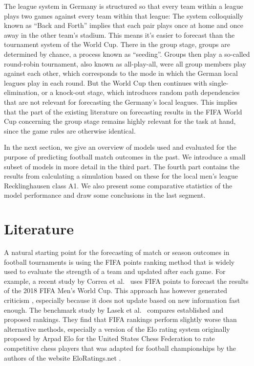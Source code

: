 \documentclass[12pt,a4paper]{article}
\begin{document}
The league system in Germany is structured so that every team within a
league plays two games against every team within that league: The system
colloquially known as \enquote{Back and Forth} implies that each pair
plays once at home and once away in the other team's stadium. This means
it's easier to forecast than the tournament system of the World Cup.
There in the group stage, groups are determined by chance, a process
known as \enquote{seeding}. Groups then play a so-called round-robin
tournament, also known as all-play-all, were all group members play
against each other, which corresponds to the mode in which the German
local leagues play in each round. But the World Cup then continues with
single-elimination, or a knock-out stage, which introduces random path
dependencies that are not relevant for forecasting the Germany's local
leagues. This implies that the part of the existing literature on
forecasting results in the FIFA World Cup concerning the group stage
remains highly relevant for the task at hand, since the game rules are
otherwise identical.

In the next section, we give an overview of models used and evaluated
for the purpose of predicting football match outcomes in the past. We
introduce a small subset of models in more detail in the third part. The
fourth part contains the results from calculating a simulation based on
these for the local men's league Recklinghausen class A1. We also
present some comparative statistics of the model performance and draw
some conclusions in the last segment.

\hypertarget{literature}{%
\section{Literature}\label{literature}}

A natural starting point for the forecasting of match or season outcomes
in football tournaments is using the FIFA points ranking method that is
widely used to evaluate the strength of a team and updated after each
game. For example, a recent study by Correa et al.~\autocite*{correa}
uses FIFA points to forecast the results of the 2018 FIFA Men's World
Cup. This approach has however generated criticism
\textcite{mchale2007}, especially because it does not update based on
new information fast enough. The benchmark study by Lasek et
al.~\autocite*{lasek2013} compares established and proposed rankings.
They find that FIFA rankings perform slightly worse than alternative
methods, especially a version of the Elo rating system originally
proposed by Arpad Elo for the United States Chess Federation to rate
competitive chess players that was adapted for football championships by
the authors of the website EloRatings.net \autocite*{eloratings}.
\end{document}
